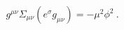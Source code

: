 \begin{equation}
g^{\mu\nu}\Sigma_{\mu\nu}(e^{\sigma}g_{\mu\nu})=-\mu^2 \phi^2~.
\label{ac}\end{equation} 

